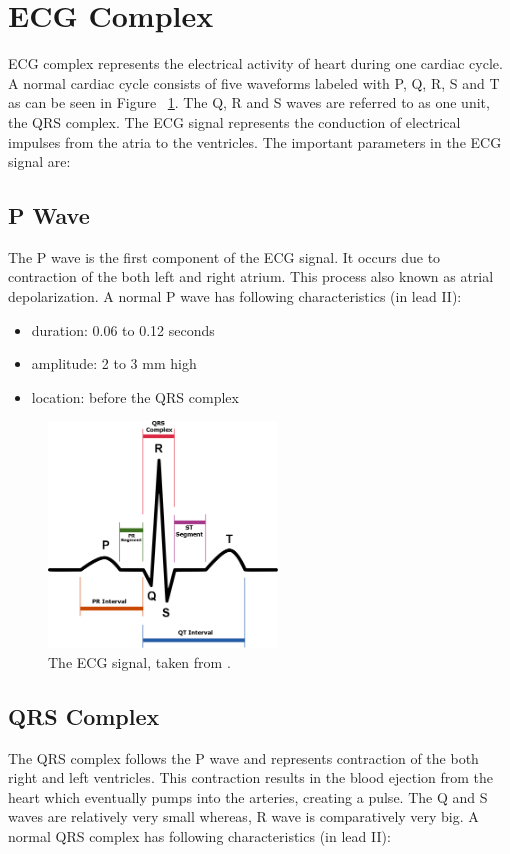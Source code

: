 \section{ECG Complex}


ECG complex represents the electrical activity of heart during one cardiac cycle. A normal cardiac cycle consists of five waveforms labeled with P, Q, R, S and T as can be seen in Figure ~\ref{fig:SinusRhythmLabels}. The Q, R and S waves are referred to as one unit, the QRS complex. The ECG signal represents the conduction of electrical impulses from the atria to the ventricles. The important parameters in the ECG signal are:

\subsection{P Wave}

The P wave is the first component of the ECG signal. It occurs due to contraction of the both left and right atrium. This process also known as atrial depolarization. A normal P wave has following characteristics (in lead II):

\begin{itemize}
	\item duration: 0.06 to 0.12 seconds
	\item amplitude: 2 to 3 mm high
	\item location: before the QRS complex
\end{itemize}

\begin{figure}[htpb]
	\centering
	\includegraphics[width=\textwidth,height=6cm,keepaspectratio=true]{images/SinusRhythmLabels}
	\caption{
		The ECG signal, taken from \cite{wiki:SinusRhythmLabels}.
	}
	\label{fig:SinusRhythmLabels}
\end{figure}

\subsection{QRS Complex}
The QRS complex follows the P wave and represents contraction of the both right and left ventricles. This contraction results in the blood ejection from the heart which eventually pumps into the arteries, creating a pulse. The Q and S waves are relatively very small whereas, R wave is comparatively very big. A normal QRS complex has following characteristics (in lead II):

